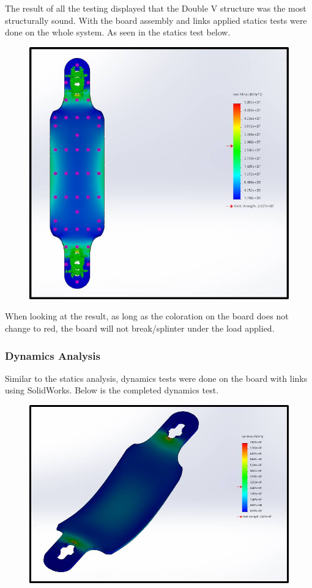 \documentclass[letterpaper,12pt]{article}
\begin{document}
The result of all the testing displayed that the Double V structure was the most structurally sound. With the board assembly and links applied statics tests were done on the whole system. As seen in the statics test below.

\begin{figure}[!htbp]\centering
\begin{minipage}{.5\textwidth}\centering
\includegraphics[width=.8\textwidth]{figs/statics-test.jpg}
\label{Statics}
\end{minipage}
\end{figure}

When looking at the result, as long as the coloration on the board does not change to red, the board will not break/splinter under the load applied.

\subsubsection{Dynamics Analysis}
Similar to the statics analysis, dynamics tests were done on the board with links using SolidWorks. Below is the completed dynamics test.

\begin{figure}[!htbp]\centering
\begin{minipage}{.5\textwidth}\centering
\includegraphics[width=.8\textwidth]{figs/dynamics-test.jpg}
\label{Dynamics}
\end{minipage}
\end{figure}
\end{document}
